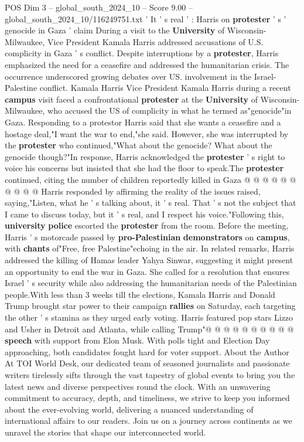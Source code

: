 \begin{textsample}{POS Dim 3 – global\_south\_2024\_10 – Score 9.00 – global\_south\_2024\_10/116249751.txt}  \label{ex:f3_pos_367}
' It ' s real ' : Harris on \textbf{protester} ' s ' genocide in Gaza ' claim During a visit to the \textbf{University} of Wisconsin-Milwaukee, Vice President Kamala Harris addressed accusations of U.S. complicity in Gaza ' s conflict.
Despite interruptions by a \textbf{protester}, Harris emphasized the need for a ceasefire and addressed the humanitarian crisis.
The occurrence underscored growing debates over US. involvement in the Israel-Palestine conflict.
Kamala Harris Vice President Kamala Harris during a recent \textbf{campus} visit faced a confrontational \textbf{protester} at the \textbf{University} of Wisconsin-Milwaukee, who accused the US of complicity in what he termed as"genocide"in Gaza.
Responding to a protestor Harris said that she wants a ceasefire and a hostage deal,"I want the war to end,"she said.
However, she was interrupted by the \textbf{protester} who continued,"What about the genocide?
What about the genocide though?"In response, Harris acknowledged the \textbf{protester} ' s right to voice his concerns but insisted that she had the floor to speak.The \textbf{protester} continued, citing the number of children reportedly killed in Gaza @ @ @ @ @ @ @ @ @ @ Harris responded by affirming the reality of the issues raised, saying,"Listen, what he ' s talking about, it ' s real.
That ' s not the subject that I came to discuss today, but it ' s real, and I respect his voice."Following this, \textbf{university} \textbf{police} escorted the \textbf{protester} from the room.
Before the meeting, Harris ' s motorcade passed by \textbf{pro-Palestinian} \textbf{demonstrators} on \textbf{campus}, with \textbf{chants} of"Free, free Palestine"echoing in the air.
In related remarks, Harris addressed the killing of Hamas leader Yahya Sinwar, suggesting it might present an opportunity to end the war in Gaza.
She called for a resolution that ensures Israel ' s security while also addressing the humanitarian needs of the Palestinian people.With less than 3 weeks till the elections, Kamala Harris and Donald Trump brought star power to their campaign \textbf{rallies} on Saturday, each targeting the other ' s stamina as they urged early voting.
Harris featured pop stars Lizzo and Usher in Detroit and Atlanta, while calling Trump"@ @ @ @ @ @ @ @ @ @ \textbf{speech} with support from Elon Musk.
With polls tight and Election Day approaching, both candidates fought hard for voter support.
About the Author At TOI World Desk, our dedicated team of seasoned journalists and passionate writers tirelessly sifts through the vast tapestry of global events to bring you the latest news and diverse perspectives round the clock.
With an unwavering commitment to accuracy, depth, and timeliness, we strive to keep you informed about the ever-evolving world, delivering a nuanced understanding of international affairs to our readers.
Join us on a journey across continents as we unravel the stories that shape our interconnected world.

\end{textsample}
